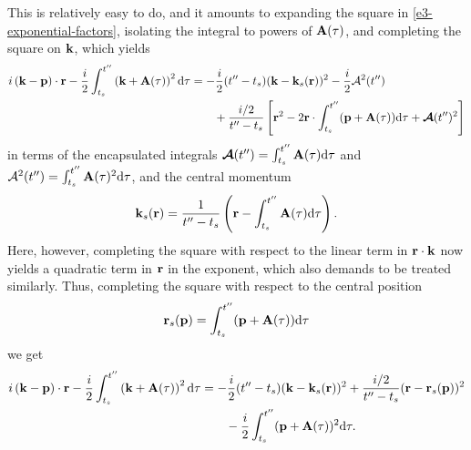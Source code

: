 This is relatively easy to do, and it amounts to expanding the square in \eqref{e3-exponential-factors}, isolating the integral to powers of $\vb{A}(\tau)$, and completing the square on $\vb{k}$, which yields
\begin{align}
i\left(\vb{k}-\vb{p}\right)\cdot\vb{r}
-\frac{i}{2} \int_{{t_s}}^{t''}\left(\vb{k}+\vb{A}(\tau)\right)^2\mathrm{d}\tau
& =
-\frac i2 (t''-{t_s}) (\vb{k}-\vb{k}_s(\vb{r}))^2
-\frac i2 \mathcal{A}^2(t'')
\nonumber \\ & \qquad
+\frac{i/2}{t''-{t_s}} \left[
  \vb{r}^2 - 2\vb{r} \cdot \int_{{t_s}}^{t''} (\vb{p}+\vb{A}(\tau))\mathrm{d}\tau  +\bm{\mathcal{A}}(t'')^2
  \right]
\label{e3-completing-squares-k}
\end{align}
in terms of the encapsulated integrals $\bm{\mathcal{A}}(t'')=\int_{{t_s}}^{t''}\vb{A}(\tau)\mathrm{d}\tau$ and $\mathcal{A}^2(t'')=\int_{{t_s}}^{t''}\vb{A}(\tau)^2\mathrm{d}\tau$, and the central momentum
\begin{equation}
\vb{k}_s(\vb{r}) = \frac{1}{t''-{t_s}} \left(  \vb{r}-\int_{{t_s}}^{t''}\vb{A}(\tau)\mathrm{d}\tau  \right)
.
\label{e3-saddle-point-k}
\end{equation}
Here, however, completing the square with respect to the linear term in $\vb{r} \cdot \vb{k}$ now yields a quadratic term in $\vb{r}$ in the exponent, which also demands to be treated similarly. Thus, completing the square with respect to the central position
\begin{equation}
\vb{r}_s(\vb{p}) = \int_{{t_s}}^{t''} (\vb{p}+\vb{A}(\tau))\mathrm{d}\tau
\label{e3-saddle-point-r-initial}
\end{equation}
we get
\begin{align}
i\left(\vb{k}-\vb{p}\right)\cdot\vb{r}
-\frac{i}{2} \int_{{t_s}}^{t''}\left(\vb{k}+\vb{A}(\tau)\right)^2\mathrm{d}\tau
& =
-\frac i2 (t''-{t_s}) (\vb{k}-\vb{k}_s(\vb{r}))^2
+\frac{i/2}{t''-{t_s}} (\vb{r}-\vb{r}_s(\vb{p}))^2
\nonumber \\ & \qquad
-\frac i2 \int_{{t_s}}^{t''} (\vb{p}+\vb{A}(\tau))^2 \mathrm{d}\tau
.
\label{e3-completing-squares-r}
\end{align}


